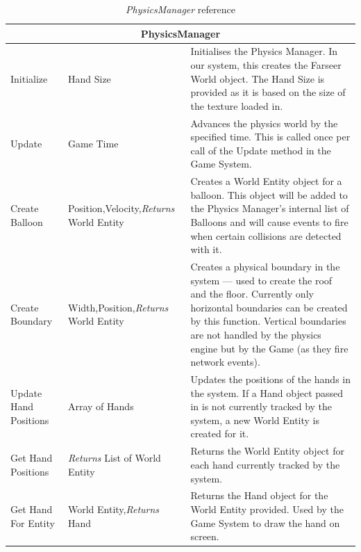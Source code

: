 \begin{longtable}{|p{4.5cm}|p{3.5cm}|p{7.7cm}|}
\caption{\emph{PhysicsManager} reference \label{PhysicsManagerRef}}
\\
\hline
\multicolumn{3}{|c|}{PhysicsManager} \\ \hline

Initialize & Hand Size &
Initialises the Physics Manager. In our system, this creates the Farseer World
object. The Hand Size is provided as it is based on the size of the texture 
loaded in. \\ \hline

Update & Game Time &
Advances the physics world by the specified time. This is called once per call
of the Update method in the Game System.\\ \hline

Create Balloon & Position,\newline Velocity,\newline \emph{Returns} World Entity &
Creates a World Entity object for a balloon. This object will be added to the 
Physics Manager's internal list of Balloons and will cause events to fire when
certain collisions are detected with it.\\ \hline

Create Boundary & Width,\newline Position,\newline \emph{Returns} World Entity &
Creates a physical boundary in the system --- used to create the roof and the 
floor. Currently only horizontal boundaries can be created by this function.
Vertical boundaries are not handled by the physics engine but by the Game (as 
they fire network events).\\ \hline

Update Hand Positions & Array of Hands &
Updates the positions of the hands in the system. If a Hand object passed in 
is not currently tracked by the system, a new World Entity is created for it.
\\ \hline

Get Hand Positions & \emph{Returns} List of World Entity &
Returns the World Entity object for each hand currently tracked by the system.
\\ \hline

Get Hand For Entity & World Entity,\newline \emph{Returns} Hand &
Returns the Hand object for the World Entity provided. Used by the Game System
to draw the hand on screen. \\ \hline


\end{longtable}
